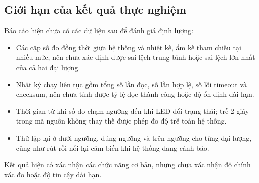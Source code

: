 \subsection{Giới hạn của kết quả thực nghiệm}
\label{sec:limitations}
Báo cáo hiện chưa có các dữ liệu sau để đánh giá định lượng:
\begin{itemize}[leftmargin=1.2cm]
    \item Các cặp số đo đồng thời giữa hệ thống và nhiệt kế, ẩm kế tham chiếu tại nhiều mức, nên chưa xác định được sai lệch trung bình hoặc sai lệch lớn nhất của cả hai đại lượng.
    \item Nhật ký chạy liên tục gồm tổng số lần đọc, số lần hợp lệ, số lỗi timeout và checksum, nên chưa tính được tỷ lệ đọc thành công hoặc độ ổn định dài hạn.
    \item Thời gian từ khi số đo chạm ngưỡng đến khi LED đổi trạng thái; trễ 2 giây trong mã nguồn không thay thế được phép đo độ trễ toàn hệ thống.
    \item Thử lặp lại ở dưới ngưỡng, đúng ngưỡng và trên ngưỡng cho từng đại lượng, cũng như rút rồi nối lại cảm biến khi hệ thống đang cảnh báo.
\end{itemize}
Kết quả hiện có xác nhận các chức năng cơ bản, nhưng chưa xác nhận độ chính xác đo hoặc độ tin cậy dài hạn.
